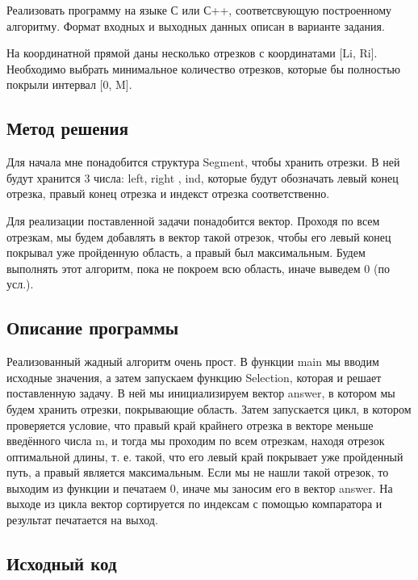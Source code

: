 \documentclass[12pt]{article}
\begin{document}
Реализовать программу на языке С или С++, соответсвующую построенному алгоритму. Формат входных и выходных данных описан в варианте задания.

На координатной прямой даны несколько отрезков с координатами [Li, Ri]. Необходимо выбрать минимальное количество отрезков, которые бы полностью покрыли интервал [0, M].

\subsection*{Метод решения}

Для начала мне понадобится структура Segment, чтобы хранить отрезки. В ней будут хранится 3 числа: left, right , ind, которые будут обозначать левый конец отрезка, правый конец отрезка и индекст отрезка соответственно.

Для реализации поставленной задачи понадобится вектор. Проходя по всем отрезкам, мы будем добавлять в вектор такой отрезок, чтобы его левый конец покрывал уже пройденную область, а правый был максимальным. Будем выполнять этот алгоритм, пока не покроем всю область, иначе выведем 0 (по усл.). 

\subsection*{Описание программы}

Реализованный жадный алгоритм очень прост. В функции main мы вводим исходные значения, а затем запускаем функцию Selection, которая и решает поставленную задачу. В ней мы инициализируем вектор answer, в котором мы будем хранить отрезки, покрывающие область. Затем запускается цикл, в котором проверяется условие, что правый край крайнего отрезка в векторе меньше введённого числа m, и тогда мы проходим по всем отрезкам, находя отрезок оптимальной длины, т. е. такой, что его левый край покрывает уже пройденный путь, а правый является максимальным. Если мы не нашли такой отрезок, то выходим из функции и печатаем 0, иначе мы заносим его в вектор answer. На выходе из цикла вектор сортируется по индексам с помощью компаратора и результат печатается на выход.

\subsection*{Исходный код}
\end{document}
